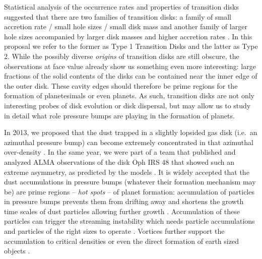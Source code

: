 \documentclass[10pt,fleqn,twoside]{article}
\begin{document}
\begin{figure}
\begin{minipage}[b]{.47\textwidth}
  \label{fig:casassus}
\end{minipage}
\end{figure}

Statistical analysis of the occurrence rates and properties of
transition disks suggested that there are two families of transition
disks: a family of small accretion rate / small hole sizes / small
disk mass and another family of larger hole sizes accompanied by
larger disk masses and higher accretion rates
\citep{2012MNRAS.426L..96O}. In this proposal we refer to the former
as Type 1 Transition Disks and the latter as Type 2. While the possibly diverse
\textit{origins} of transition disks are still obscure, the
observations at face value already show us something even more
interesting: large fractions of the solid contents of the disks can be
contained near the inner edge of the outer disk.
These cavity edges should therefore be prime regions for the formation
of planetesimals or even planets. As such, transition disks are not
only interesting probes of disk evolution or disk dispersal, but may
allow us to study in detail what role pressure bumps are playing in
the formation of planets.

In 2013, we proposed  that the dust trapped in a slightly lopsided gas
disk (i.e.\ an azimuthal pressure bump) can become extremely
concentrated in that azimuthal over-density
\citep[see][]{2013A&A...550L...8B}. In the same year, we were part of
a team that published and analyzed ALMA observations of the disk Oph
IRS 48 that showed such an extreme asymmetry, as predicted by the
models \citep[see][]{2013Sci...340.1199V}. It is widely accepted that
the dust accumulations in pressure bumps (whatever their formation
mechanism may be) are prime regions -- \textit{hot spots} -- of planet
formation: accumulation of particles in pressure bumps
\citep[e.g.,][]{2007ApJ...664L..55K} prevents them from drifting away
and shortens the growth time scales of dust particles allowing further
growth \citep{2008A&A...487L...1B}. Accumulation of these particles
can trigger the streaming instability which needs particle
accumulations and particles of the right sizes to operate
\citep{2005ApJ...620..459Y,2007Natur.448.1022J}.
Vortices further support the accumulation to critical densities
\citep{1995A&A...295L...1B,1997Icar..128..213K,2015ApJ...804...35R} or
even the direct formation of earth sized objects
\citep{2009A&A...493.1125L}.
\end{document}
